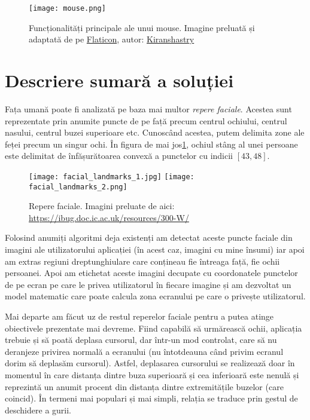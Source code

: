 \begin{figure}[h]
    \centering
    \texttt{[image: mouse.png]}
    \caption{Funcționalități principale ale unui mouse. Imagine preluată și adaptată de pe \href{https://www.flaticon.com}{Flaticon}, autor: \href{https://www.flaticon.com/authors/kiranshastry}{Kiranshastry}}
\end{figure}


\section*{Descriere sumară a soluției}

Fața umană poate fi analizată pe baza mai multor \emph{repere faciale}.
Acestea sunt reprezentate prin anumite puncte de pe față precum centrul ochiului, centrul nasului, centrul buzei superioare etc.
Cunoscând acestea, putem delimita zone ale feței precum un singur ochi.
În figura de mai jos\ref{figure:facial-landmarks}, ochiul stâng al unei persoane este delimitat de înfășurătoarea convexă a punctelor cu indicii $[43, 48]$.

\begin{figure}[h]
    \centering
    \texttt{[image: facial\_landmarks\_1.jpg]}
    \texttt{[image: facial\_landmarks\_2.png]}
    \caption{Repere faciale. Imagini preluate de aici: \url{https://ibug.doc.ic.ac.uk/resources/300-W/}}
    \label{figure:facial-landmarks}
\end{figure}

Folosind anumiți algoritmi deja existenți am detectat aceste puncte faciale din imagini ale utilizatorului aplicației (în acest caz, imagini cu mine însumi) iar apoi am extras regiuni dreptunghiulare care conțineau fie întreaga față, fie ochii persoanei.
Apoi am etichetat aceste imagini decupate cu coordonatele punctelor de pe ecran pe care le privea utilizatorul în fiecare imagine și am dezvoltat un model matematic care poate calcula zona ecranului pe care o privește utilizatorul.

Mai departe am făcut uz de restul reperelor faciale pentru a putea atinge obiectivele prezentate mai devreme.
Fiind capabilă să urmărească ochii, aplicația trebuie și să poată deplasa cursorul, dar într-un mod controlat, care să nu deranjeze privirea normală a ecranului (nu întotdeauna când privim ecranul dorim să deplasăm cursorul).
Astfel, deplasarea cursorului se realizează doar în momentul în care distanța dintre buza superioară și cea inferioară este nenulă și reprezintă un anumit procent din distanța dintre extremitățile buzelor (care coincid).
În termeni mai populari și mai simpli, relația se traduce prin gestul de deschidere a gurii.

